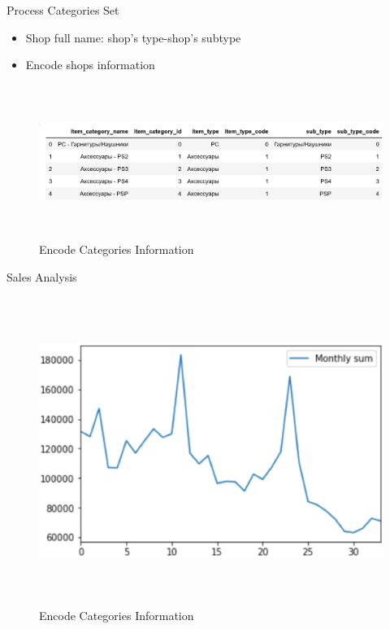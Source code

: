 \documentclass[
size=12pt,
paper=smartboard,  %
mode=present, 		%
display=slides, 	%
style=tuliplab,  	%
pauseslide,
fleqn,leqno]{powerdot}
\begin{document}
	\begin{slide}[toc=Process Categories Set]{Process Categories Set}
		\begin{itemize}
			\item Shop full name: shop's type-shop's subtype
			\item Encode shops information
		\end{itemize}
		\begin{figure}[htb]
			\centering
			\includegraphics[width=19cm, height=5cm]{figures/category code.eps}
			\caption{Encode Categories Information
			}\label{straddltimeScale}
		\end{figure}
	\end{slide}
	\begin{slide}[toc=Sales Analysis]{Sales Analysis}
		\begin{figure}[htb]
			\centering
			\includegraphics[width=15cm, height=10cm]{figures/sum.eps}
			\caption{Encode Categories Information
			}\label{straddltimeScale}
		\end{figure}
	\end{slide}
\end{document}

